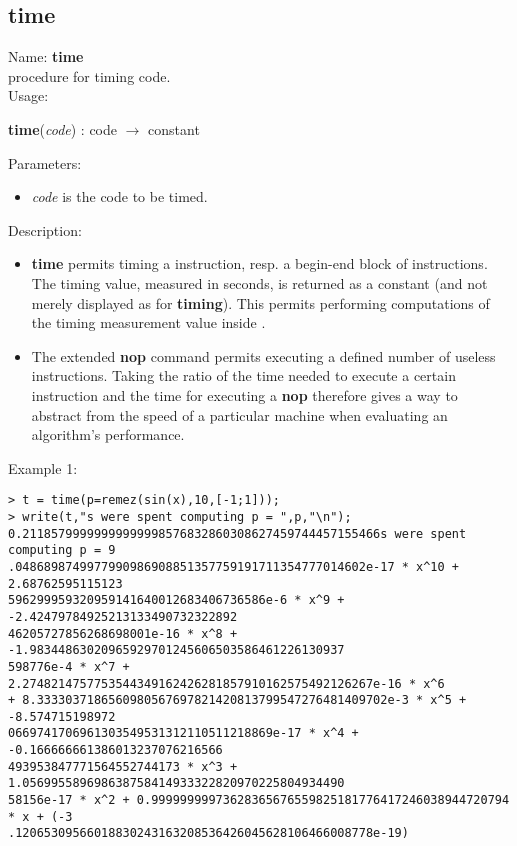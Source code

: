 \subsection{time}
\label{labtime}
\noindent Name: \textbf{time}\\
\phantom{aaa}procedure for timing \sollya code.\\[0.2cm]
\noindent Usage: 
\begin{center}
\textbf{time}(\emph{code}) : \textsf{code} $\rightarrow$ \textsf{constant}\\
\end{center}
Parameters: 
\begin{itemize}
\item \emph{code} is the code to be timed.
\end{itemize}
\noindent Description: \begin{itemize}

\item \textbf{time} permits timing a \sollya instruction, resp. a begin-end block
   of \sollya instructions. The timing value, measured in seconds, is returned
   as a \sollya constant (and not merely displayed as for \textbf{timing}). This 
   permits performing computations of the timing measurement value inside \sollya.

\item The extended \textbf{nop} command permits executing a defined number of
   useless instructions. Taking the ratio of the time needed to execute a
   certain \sollya instruction and the time for executing a \textbf{nop}
   therefore gives a way to abstract from the speed of a particular 
   machine when evaluating an algorithm's performance.
\end{itemize}
\noindent Example 1: 
\begin{center}\begin{minipage}{15cm}\begin{Verbatim}[frame=single]
> t = time(p=remez(sin(x),10,[-1;1]));
> write(t,"s were spent computing p = ",p,"\n");
0.21185799999999999998576832860308627459744457155466s were spent computing p = 9
.0486898749977990986908851357759191711354777014602e-17 * x^10 + 2.68762595115123
596299959320959141640012683406736586e-6 * x^9 + -2.42479784925213133490732322892
46205727856268698001e-16 * x^8 + -1.98344863020965929701245606503586461226130937
598776e-4 * x^7 + 2.2748214757753544349162426281857910162575492126267e-16 * x^6 
+ 8.3333037186560980567697821420813799547276481409702e-3 * x^5 + -8.574715198972
0669741706961303549531312110511218869e-17 * x^4 + -0.166666661386013237076216566
493953847771564552744173 * x^3 + 1.056995589698638758414933322820970225804934490
58156e-17 * x^2 + 0.99999999973628365676559825181776417246038944720794 * x + (-3
.12065309566018830243163208536426045628106466008778e-19)
\end{Verbatim}
\end{minipage}\end{center}
